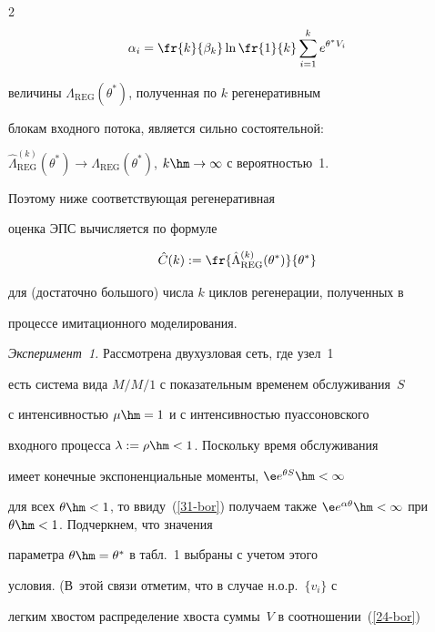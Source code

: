 \begin{multicols}{2}
\begin{equation*}
{\alpha_i}=  \fr{k}{\beta_k}

  \ln\fr{1}{k} \sum\limits_{i=1}^{k} e^{\theta^*  V_i}


\end{equation*}

величины $\Lambda_{\mathrm{REG}}(\theta^*)$, полученная по $k$ регенеративным

блокам входного потока, является сильно состоятельной:

$

\hat \Lambda_{\mathrm{REG}}^{(k)} (\theta^*)\to

\Lambda_{\mathrm{REG}}(\theta^*)$, $k\hm\to \infty$ с вероятностью~1.

Поэтому ниже соответствующая регенеративная

оценка ЭПС вычисляется по формуле

\begin{equation}

\hat C(k):=\fr{\hat \Lambda_{\mathrm{REG}}^{(k)}(\theta^*)}{\theta^*}

\label{40-bor}

\end{equation}

для (достаточно большого) числа $k$ циклов регенерации, полученных в

процессе имитационного моделирования.






{\it Эксперимент~1.} Рассмотрена  двухузловая   сеть, где узел~1

есть система вида $M/M/1$ с показательным  временем обслуживания~$S$

с интенсивностью $\mu\hm= 1$ и с интенсивностью  пуассоновского

входного процесса $\lambda:=\rho\hm<1$. Поскольку время обслуживания

имеет конечные экспоненциальные моменты, $\e e^{\theta S}\hm<\infty$

для всех $\theta\hm<1$, то ввиду~(\ref{31-bor}) получаем также $\e

e^{\alpha \theta }\hm<\infty $ при $\theta\hm<1$. Подчеркнем, что значения

параметра $\theta\hm=\theta^*$ в табл.~1 выбраны с учетом этого

условия. (В~этой связи отметим, что в случае н.о.р.\ $\{v_i\}$ с

легким хвостом распределение хвоста суммы~$V$ в соотношении~(\ref{24-bor}) 


\end{multicols}
